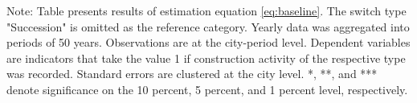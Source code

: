 \begin{table}[htbp]
\begin{tabular}{lcccc}
      
   \end{tabular}
   
   \par \raggedright 
   Note: Table presents results of estimation equation \eqref{eq:baseline}. The switch type "Succession" is omitted as the  reference category. Yearly data was aggregated into periods of 50 years. Observations are at the city-period  level. Dependent variables are indicators that take the value 1 if  construction activity of the respective type was recorded. Standard errors are  clustered at the city level. *, **, and *** denote significance on the 10 percent, 5 percent, and 1 percent  level, respectively.
\end{table}
